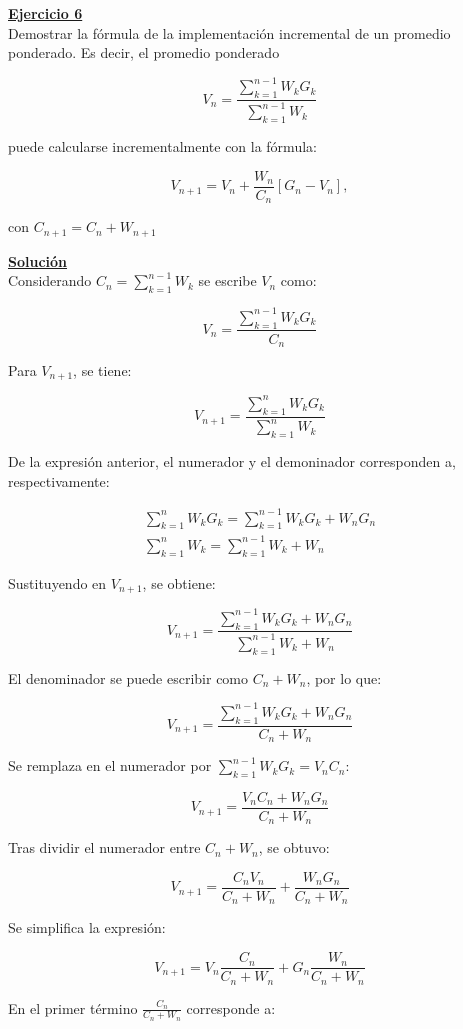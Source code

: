 \indent\underline{\textbf{Ejercicio 6}}\\
Demostrar la fórmula de la implementación incremental de un promedio ponderado.
Es decir, el promedio ponderado

\[
    V_n = \frac{\sum_{k=1}^{n-1} W_k G_k}{\sum_{k=1}^{n-1} W_k}
\]

puede calcularse incrementalmente con la fórmula:

\[
    V_{n+1} = V_n + \frac{W_n}{C_n}\left[G_n - V_n\right],
\]

con $C_{n+1} = C_n + W_{n+1}$

\indent\underline{\textbf{Solución}}\\

Considerando $C_n = \sum_{k=1}^{n-1} W_k$ se escribe $V_n$ como:

\[
    V_n = \frac{\sum_{k=1}^{n-1} W_k G_k}{C_n}
\]

Para $V_{n+1}$, se tiene:

\[
    V_{n+1} = \frac{\sum_{k=1}^{n} W_k G_k}{\sum_{k=1}^{n} W_k}
\]

De la expresión anterior, el numerador y el demoninador corresponden a, respectivamente:

\begin{align*}
    \sum_{k=1}^{n} W_k G_k = \sum_{k=1}^{n-1} W_k G_k + W_n G_n \\
    \sum_{k=1}^{n} W_k = \sum_{k=1}^{n-1} W_k + W_n
\end{align*}

Sustituyendo en $V_{n+1}$, se obtiene:

\[
    V_{n+1} = \frac{\sum_{k=1}^{n-1} W_k G_k + W_n G_n}{\sum_{k=1}^{n-1} W_k + W_n}
\]

El denominador se puede escribir como $C_n + W_n$, por lo que:

\[
    V_{n+1} = \frac{\sum_{k=1}^{n-1} W_k G_k + W_n G_n}{C_n + W_n}
\]

Se remplaza en el numerador por $\sum_{k=1}^{n-1} W_k G_k = V_n C_n$:

\[
    V_{n+1} = \frac{V_n C_n + W_n G_n}{C_n + W_n}
\]

Tras dividir el numerador entre $C_n + W_n$, se obtuvo:

\[
    V_{n+1} = \frac{C_n V_n}{C_n + W_n} + \frac{W_n G_n}{C_n + W_n}
\]

Se simplifica la expresión:

\[
    V_{n+1} = V_n \frac{C_n}{C_n + W_n} + G_n \frac{W_n}{C_n + W_n}
\]

En el primer término $\frac{C_n}{C_n + W_n}$ corresponde a:

